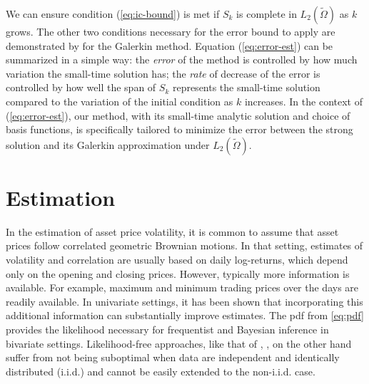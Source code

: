 We can ensure condition (\ref{eq:ic-bound}) is met if $S_k$ is
complete in $L_2(\tilde{\Omega})$ as $k$ grows. The other two conditions
necessary for the error bound to apply are demonstrated by
\cite{bramble1977some} for the Galerkin method. Equation
(\ref{eq:error-est}) can be summarized in a simple way: the
\textit{error} of the method is controlled by how much variation the
small-time solution has; the \textit{rate} of decrease of the error is
controlled by how well the span of $S_k$ represents the small-time
solution compared to the variation of the initial condition as $k$
increases. In the context of (\ref{eq:error-est}), our method, with
its small-time analytic solution and choice of basis functions, is
specifically tailored to minimize the error between the strong
solution and its Galerkin approximation under $L_2(\tilde{\Omega})$.



\section{Estimation}
In the estimation of asset price volatility, it is common to assume
that asset prices follow correlated geometric Brownian motions.  In
that setting, estimates of volatility and correlation are usually
based on daily log-returns, which depend only on the opening and
closing prices.  However, typically more information is available.
For example, maximum and minimum trading prices over the days are
readily available.  In univariate settings, it has been shown that
incorporating this additional information can substantially improve
estimates.  The pdf from \eqref{eq:pdf} provides the likelihood
necessary for frequentist and Bayesian inference in bivariate
settings.  Likelihood-free approaches, like that of
\cite{rogers1991estimating}, \cite{rogers2008estimating}, on the other
hand suffer from not being suboptimal when data are independent and
identically distributed (i.i.d.) and cannot be easily extended to the
non-i.i.d. case.

